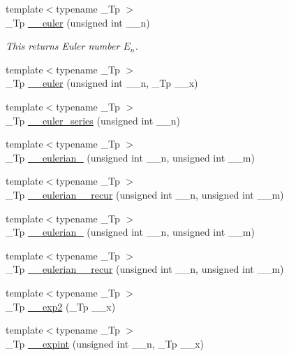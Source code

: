 \begin{DoxyCompactItemize}
{\footnotesize template$<$typename \+\_\+\+Tp $>$ }\\\+\_\+\+Tp \hyperlink{namespacestd_1_1____detail_a38f2ed4541c9876b8549c3917aad3b08}{\+\_\+\+\_\+euler} (unsigned int \+\_\+\+\_\+n)
\begin{DoxyCompactList}\small\item\em This returns Euler number $ E_n $. \end{DoxyCompactList}\item 
{\footnotesize template$<$typename \+\_\+\+Tp $>$ }\\\+\_\+\+Tp \hyperlink{namespacestd_1_1____detail_aa44d18f565c3c36ba0351374dc4af09d}{\+\_\+\+\_\+euler} (unsigned int \+\_\+\+\_\+n, \+\_\+\+Tp \+\_\+\+\_\+x)
\item 
{\footnotesize template$<$typename \+\_\+\+Tp $>$ }\\\+\_\+\+Tp \hyperlink{namespacestd_1_1____detail_a2e3eb67dee4d0b5c96824a4e8e9c227e}{\+\_\+\+\_\+euler\+\_\+series} (unsigned int \+\_\+\+\_\+n)
\item 
{\footnotesize template$<$typename \+\_\+\+Tp $>$ }\\\+\_\+\+Tp \hyperlink{namespacestd_1_1____detail_a4556229d8792527574bfc6fa135908dd}{\+\_\+\+\_\+eulerian\+\_} (unsigned int \+\_\+\+\_\+n, unsigned int \+\_\+\+\_\+m)
\item 
{\footnotesize template$<$typename \+\_\+\+Tp $>$ }\\\+\_\+\+Tp \hyperlink{namespacestd_1_1____detail_afab99319465d188432fa8357d65129e0}{\+\_\+\+\_\+eulerian\+\_\+\_\+recur} (unsigned int \+\_\+\+\_\+n, unsigned int \+\_\+\+\_\+m)
\item 
{\footnotesize template$<$typename \+\_\+\+Tp $>$ }\\\+\_\+\+Tp \hyperlink{namespacestd_1_1____detail_aa93423478ed5fd1fc260cc30466bef73}{\+\_\+\+\_\+eulerian\+\_} (unsigned int \+\_\+\+\_\+n, unsigned int \+\_\+\+\_\+m)
\item 
{\footnotesize template$<$typename \+\_\+\+Tp $>$ }\\\+\_\+\+Tp \hyperlink{namespacestd_1_1____detail_a8a2a09c66c530759ae98ac1f3c1d93e5}{\+\_\+\+\_\+eulerian\+\_\+\_\+recur} (unsigned int \+\_\+\+\_\+n, unsigned int \+\_\+\+\_\+m)
\item 
{\footnotesize template$<$typename \+\_\+\+Tp $>$ }\\\+\_\+\+Tp \hyperlink{namespacestd_1_1____detail_a51c70764063ef329a4ab96f837c99faf}{\+\_\+\+\_\+exp2} (\+\_\+\+Tp \+\_\+\+\_\+x)
\item 
{\footnotesize template$<$typename \+\_\+\+Tp $>$ }\\\+\_\+\+Tp \hyperlink{namespacestd_1_1____detail_a0282700710ec07b8ca095fe2ec140d6e}{\+\_\+\+\_\+expint} (unsigned int \+\_\+\+\_\+n, \+\_\+\+Tp \+\_\+\+\_\+x)

\end{DoxyCompactItemize}
